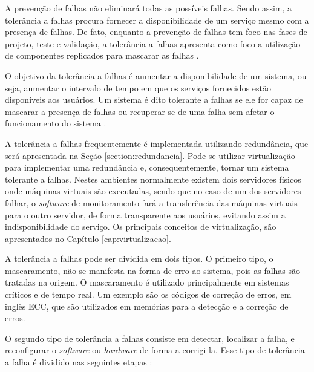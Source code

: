 A prevenção de falhas não eliminará todas as possíveis falhas. Sendo assim, a tolerância a falhas procura fornecer a disponibilidade de 
um serviço mesmo com a presença de falhas. De fato, enquanto a prevenção de falhas tem foco nas fases de projeto, teste e validação, a 
tolerância a falhas apresenta como foco a utilização de componentes replicados para mascarar as falhas \cite{pankaj1994}.

O objetivo da tolerância a falhas é aumentar a disponibilidade de um sistema, ou seja, aumentar o intervalo de tempo em que os serviços 
fornecidos estão disponíveis aos usuários. Um sistema é dito tolerante a falhas se ele for capaz de mascarar a presença de falhas ou recuperar-se 
de uma falha sem afetar o funcionamento do sistema \cite{pankaj1994}. %

A tolerância a falhas frequentemente é implementada utilizando redundância, que será apresentada na Seção \ref{section:redundancia}. 
Pode-se utilizar virtualização para implementar uma redundância e, consequentemente, tornar um sistema tolerante a falhas. Nestes ambientes 
normalmente existem dois servidores físicos onde máquinas virtuais são executadas, sendo que no caso de um dos servidores falhar, o 
\textit{software} de monitoramento fará a transferência das máquinas virtuais para o outro servidor, de forma transparente aos usuários, 
evitando assim a indisponibilidade do serviço. Os principais conceitos de virtualização, são apresentados no Capítulo \ref{cap:virtualizacao}.

A tolerância a falhas pode ser dividida em dois tipos. O primeiro tipo, o mascaramento, não se manifesta na forma de erro ao sistema, 
pois as falhas são tratadas na origem. O mascaramento é utilizado principalmente em sistemas críticos e de tempo real. Um exemplo são os 
códigos de correção de erros, em inglês \ac{ECC}, que são utilizados em memórias para a detecção e a correção de erros.

O segundo tipo de tolerância a falhas consiste em detectar, localizar a falha, e reconfigurar o \textit{software} ou \textit{hardware} de 
forma a corrigi-la. Esse tipo de tolerância a falha é dividido nas seguintes etapas \cite{weber2002}:

